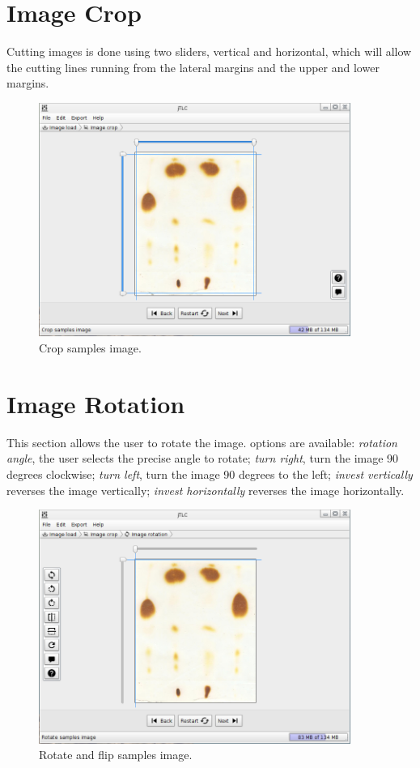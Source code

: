 \section{Image Crop}
Cutting images is done using two sliders, vertical and horizontal, which will allow the cutting lines running from the lateral margins and the upper and lower margins.
\begin{figure}[H]
	\vspace{0cm}
	\centering
	\includegraphics[width=385px]{imagenes/crop}
	\centering
	\vspace{-0.4cm}
	\caption{Crop samples image.}
	\label{fig:image_cut}
	\vspace{-0.25cm}
\end{figure}
\newpage

\section{Image Rotation}
This section allows the user to rotate the image. options are available: \emph{rotation angle}, the user selects the precise angle to rotate; \emph{turn right}, turn the image 90 degrees clockwise; \emph{turn left}, turn the image 90 degrees to the left; \emph{invest vertically} reverses the image vertically; \emph{invest horizontally} reverses the image horizontally.
\begin{figure}[H]
	\vspace{0cm}
	\centering
	\includegraphics[width=385px]{imagenes/rotate}
	\centering
	\vspace{-0.4cm}
	\caption{Rotate and flip samples image.}
	\label{fig:image_rot}
	\vspace{-0.25cm}
\end{figure}
\newpage

